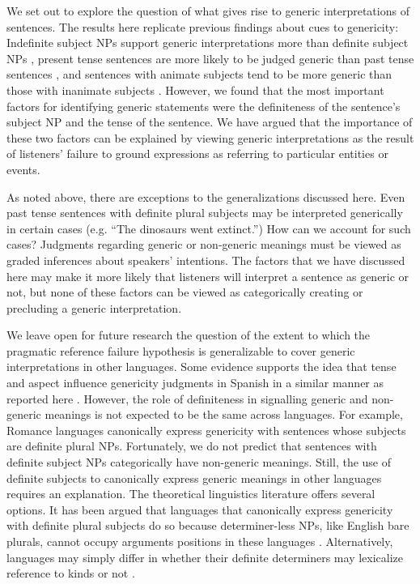 \documentclass[10pt,letterpaper]{article}
\begin{document}
We set out to explore the question of what gives rise to generic interpretations of sentences. The results here replicate previous findings about cues to genericity: Indefinite subject NPs support generic interpretations more than definite subject NPs \cite{Cimpian:2011, Gelman:2003}, present tense sentences are more likely to be judged generic than past tense sentences \cite{Cimpian:2011}, and sentences with animate subjects tend to be more generic than those with inanimate subjects \cite{Brandone:2009}. However, we found that the most important factors for identifying generic statements were the definiteness of the sentence's subject NP and the tense of the sentence. We have argued that the importance of these two factors can be explained by viewing generic interpretations as the result of listeners' failure to ground expressions as referring to particular entities or events.

As noted above, there are exceptions to the generalizations discussed here. Even past tense sentences with definite plural subjects may be interpreted generically in certain cases (e.g. ``The dinosaurs went extinct.'') How can we account for such cases? Judgments regarding generic or non-generic meanings must be viewed as graded inferences about speakers' intentions. The factors that we have discussed here may make it more likely that listeners will interpret a sentence as generic or not, but none of these factors can be viewed as categorically creating or precluding a generic interpretation.

We leave open for future research the question of the extent to which the pragmatic reference failure hypothesis is generalizable to cover generic interpretations in other languages. Some evidence supports the idea that tense and aspect influence genericity judgments in Spanish in a similar manner as reported here \cite{Perez-Leroux:2004}. However, the role of definiteness in signalling generic and non-generic meanings is not expected to be the same across languages. For example, Romance languages canonically express genericity with sentences whose subjects are definite plural NPs. Fortunately, we do not predict that sentences with definite subject NPs categorically have non-generic meanings. Still, the use of definite subjects to canonically express generic meanings in other languages requires an explanation. The theoretical linguistics literature offers several options. It has been argued that languages that canonically express genericity with definite plural subjects do so because determiner-less NPs, like English bare plurals, cannot occupy arguments positions in these languages \cite{Chierchia:1998}. Alternatively, languages may simply differ in whether their definite determiners may lexicalize reference to kinds or not \cite{Dayal:2004}.
\end{document}
